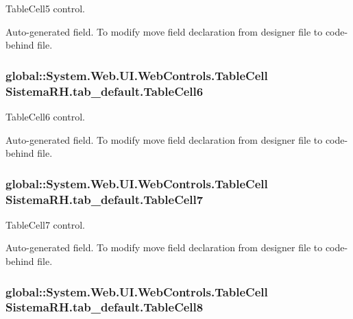 TableCell5 control. 

Auto-\/generated field. To modify move field declaration from designer file to code-\/behind file. \hypertarget{class_sistema_r_h_1_1tab__default_aad8487f0eaefdcb616cdc3d2cc21245e}{
\subsubsection[{TableCell6}]{\setlength{\rightskip}{0pt plus 5cm}global::System.Web.UI.WebControls.TableCell {\bf SistemaRH.tab\_\-default.TableCell6}}}
\label{class_sistema_r_h_1_1tab__default_aad8487f0eaefdcb616cdc3d2cc21245e}


TableCell6 control. 

Auto-\/generated field. To modify move field declaration from designer file to code-\/behind file. \hypertarget{class_sistema_r_h_1_1tab__default_ac0d184d5ba7688ee9b13fd5baa0758a9}{
\subsubsection[{TableCell7}]{\setlength{\rightskip}{0pt plus 5cm}global::System.Web.UI.WebControls.TableCell {\bf SistemaRH.tab\_\-default.TableCell7}}}
\label{class_sistema_r_h_1_1tab__default_ac0d184d5ba7688ee9b13fd5baa0758a9}


TableCell7 control. 

Auto-\/generated field. To modify move field declaration from designer file to code-\/behind file. \hypertarget{class_sistema_r_h_1_1tab__default_a8bb9079f84e1f6527220772d29f5cca4}{
\subsubsection[{TableCell8}]{\setlength{\rightskip}{0pt plus 5cm}global::System.Web.UI.WebControls.TableCell {\bf SistemaRH.tab\_\-default.TableCell8}}}
\label{class_sistema_r_h_1_1tab__default_a8bb9079f84e1f6527220772d29f5cca4}


